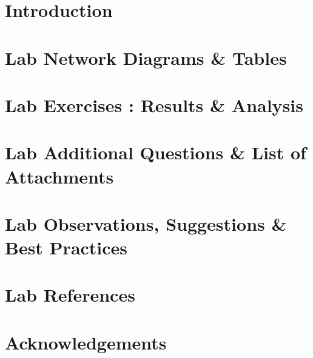 \documentclass{report}
\begin{document}


\tableofcontents
\listoffigures
\listoftables
\listoftodos

\newpage
\section{Introduction} \label{sec1}


\newpage
\section{Lab Network Diagrams \& Tables} \label{sec2}


\newpage
\section{Lab Exercises : Results \& Analysis} \label{sec3}

\newpage

\newpage

\newpage



\newpage
\section{Lab Additional Questions \& List of Attachments} \label{sec4}

\newpage
\section{Lab Observations, Suggestions \& Best Practices} \label{sec5}

\section{Lab References} \label{sec6}

\section{Acknowledgements} \label{sec7}

\end{document}
